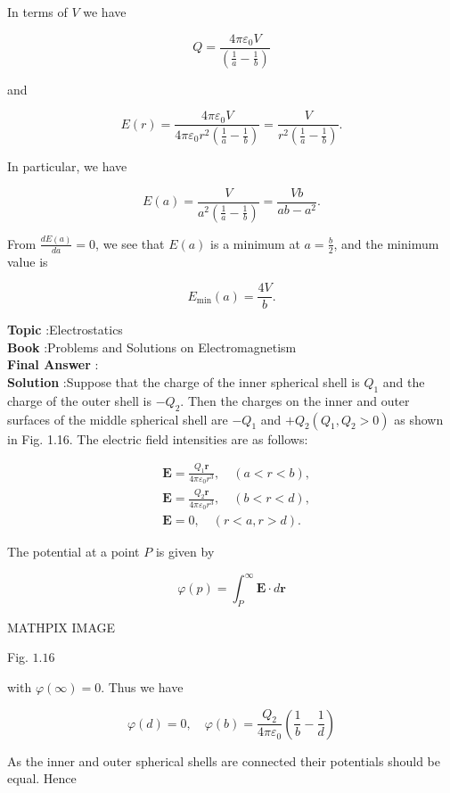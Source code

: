 \documentclass[10pt]{article}
\begin{document}
In terms of $V$ we have

$$
Q=\frac{4 \pi \varepsilon_{0} V}{\left(\frac{1}{a}-\frac{1}{b}\right)}
$$

and

$$
E(r)=\frac{4 \pi \varepsilon_{0} V}{4 \pi \varepsilon_{0} r^{2}\left(\frac{1}{a}-\frac{1}{b}\right)}=\frac{V}{r^{2}\left(\frac{1}{a}-\frac{1}{b}\right)} .
$$

In particular, we have

$$
E(a)=\frac{V}{a^{2}\left(\frac{1}{a}-\frac{1}{b}\right)}=\frac{V b}{a b-a^{2}} .
$$

From $\frac{d E(a)}{d a}=0$, we see that $E(a)$ is a minimum at $a=\frac{b}{2}$, and the minimum value is

$$
E_{\min }(a)=\frac{4 V}{b} .
$$

\textbf{Topic} :Electrostatics\\
\textbf{Book} :Problems and Solutions on Electromagnetism\\
\textbf{Final Answer} :\\


\textbf{Solution} :Suppose that the charge of the inner spherical shell is $Q_{1}$ and the charge of the outer shell is $-Q_{2}$. Then the charges on the inner and outer surfaces of the middle spherical shell are $-Q_{1}$ and $+Q_{2}\left(Q_{1}, Q_{2}>0\right)$ as shown in Fig. 1.16. The electric field intensities are as follows:

$$
\begin{aligned}
&\mathbf{E}=\frac{Q_{1} \mathbf{r}}{4 \pi \varepsilon_{0} r^{3}}, \quad(a<r<b), \\
&\mathbf{E}=\frac{Q_{2} \mathbf{r}}{4 \pi \varepsilon_{0} r^{3}}, \quad(b<r<d), \\
&\mathbf{E}=0, \quad(r<a, r>d) .
\end{aligned}
$$

The potential at a point $P$ is given by

$$
\varphi(p)=\int_{P}^{\infty} \mathbf{E} \cdot d \mathbf{r}
$$

MATHPIX IMAGE

Fig. $1.16$

with $\varphi(\infty)=0$. Thus we have

$$
\varphi(d)=0, \quad \varphi(b)=\frac{Q_{2}}{4 \pi \varepsilon_{0}}\left(\frac{1}{b}-\frac{1}{d}\right)
$$

As the inner and outer spherical shells are connected their potentials should be equal. Hence
\end{document}
